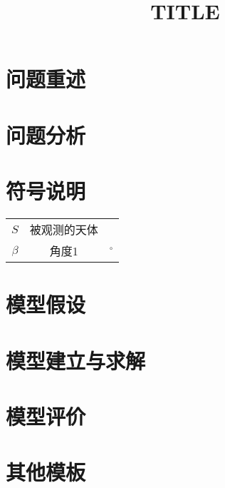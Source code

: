 \documentclass{cumcmthesis}
\title{TITLE}
\begin{document}
	\maketitle
	\begin{abstract}


	\end{abstract}

	\section{问题重述}


	\section{问题分析}

	
	\section{符号说明}
	\begin{center}
		\begin{tabular}{ccc}
			\hline
			\makebox[0.3\textwidth][c]{符号}	& 
			\makebox[0.4\textwidth][c]{说明}	&
			\makebox[0.3\textwidth][c]{单位} \\ \hline
			$S$	    & 被观测的天体            &    \\ 
			$\beta$	& 角度1                  & $^\circ$  \\ \hline
		\end{tabular}
	\end{center}
	

	\section{模型假设}
	
	
	\section{模型建立与求解}
	
	
	\section{模型评价}
	
	
	\newpage            %
	\section{其他模板}
	\subsection{}       %
\end{document}
